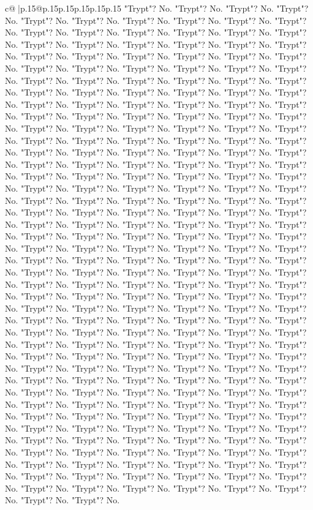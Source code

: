 \documentclass{article}
\begin{document}
{\begin{supertabular}{c@{$\;$}|p{.15\linewidth}@{}p{.15\linewidth}p{.15\linewidth}p{.15\linewidth}p{.15\linewidth}p{.15\linewidth}}
{{{"Trypt"? No. "Trypt"? No. "Trypt"? No. "Trypt"? No. "Trypt"? No. "Trypt"? No. "Trypt"? No. "Trypt"? No. "Trypt"? No. "Trypt"? No. "Trypt"? No. "Trypt"? No. "Trypt"? No. "Trypt"? No. "Trypt"? No. "Trypt"? No. "Trypt"? No. "Trypt"? No. "Trypt"? No. "Trypt"? No. "Trypt"? No. "Trypt"? No. "Trypt"? No. "Trypt"? No. "Trypt"? No. "Trypt"? No. "Trypt"? No. "Trypt"? No. "Trypt"? No. "Trypt"? No. "Trypt"? No. "Trypt"? No. "Trypt"? No. "Trypt"? No. "Trypt"? No. "Trypt"? No. "Trypt"? No. "Trypt"? No. "Trypt"? No. "Trypt"? No. "Trypt"? No. "Trypt"? No. "Trypt"? No. "Trypt"? No. "Trypt"? No. "Trypt"? No. "Trypt"? No. "Trypt"? No. "Trypt"? No. "Trypt"? No. "Trypt"? No. "Trypt"? No. "Trypt"? No. "Trypt"? No. "Trypt"? No. "Trypt"? No. "Trypt"? No. "Trypt"? No. "Trypt"? No. "Trypt"? No. "Trypt"? No. "Trypt"? No. "Trypt"? No. "Trypt"? No. "Trypt"? No. "Trypt"? No. "Trypt"? No. "Trypt"? No. "Trypt"? No. "Trypt"? No. "Trypt"? No. "Trypt"? No. "Trypt"? No. "Trypt"? No. "Trypt"? No. "Trypt"? No. "Trypt"? No. "Trypt"? No. "Trypt"? No. "Trypt"? No. "Trypt"? No. "Trypt"? No. "Trypt"? No. "Trypt"? No. "Trypt"? No. "Trypt"? No. "Trypt"? No. "Trypt"? No. "Trypt"? No. "Trypt"? No. "Trypt"? No. "Trypt"? No. "Trypt"? No. "Trypt"? No. "Trypt"? No. "Trypt"? No. "Trypt"? No. "Trypt"? No. "Trypt"? No. "Trypt"? No. "Trypt"? No. "Trypt"? No. "Trypt"? No. "Trypt"? No. "Trypt"? No. "Trypt"? No. "Trypt"? No. "Trypt"? No. "Trypt"? No. "Trypt"? No. "Trypt"? No. "Trypt"? No. "Trypt"? No. "Trypt"? No. "Trypt"? No. "Trypt"? No. "Trypt"? No. "Trypt"? No. "Trypt"? No. "Trypt"? No. "Trypt"? No. "Trypt"? No. "Trypt"? No. "Trypt"? No. "Trypt"? No. "Trypt"? No. "Trypt"? No. "Trypt"? No. "Trypt"? No. "Trypt"? No. "Trypt"? No. "Trypt"? No. "Trypt"? No. "Trypt"? No. "Trypt"? No. "Trypt"? No. "Trypt"? No. "Trypt"? No. "Trypt"? No. "Trypt"? No. "Trypt"? No. "Trypt"? No. "Trypt"? No. "Trypt"? No. "Trypt"? No. "Trypt"? No. "Trypt"? No. "Trypt"? No. "Trypt"? No. "Trypt"? No. "Trypt"? No. "Trypt"? No. "Trypt"? No. "Trypt"? No. "Trypt"? No. "Trypt"? No. "Trypt"? No. "Trypt"? No. "Trypt"? No. "Trypt"? No. "Trypt"? No. "Trypt"? No. "Trypt"? No. "Trypt"? No. "Trypt"? No. "Trypt"? No. "Trypt"? No. "Trypt"? No. "Trypt"? No. "Trypt"? No. "Trypt"? No. "Trypt"? No. "Trypt"? No. "Trypt"? No. "Trypt"? No. "Trypt"? No. "Trypt"? No. "Trypt"? No. "Trypt"? No. "Trypt"? No. "Trypt"? No. "Trypt"? No. "Trypt"? No. "Trypt"? No. "Trypt"? No. "Trypt"? No. "Trypt"? No. "Trypt"? No. "Trypt"? No. "Trypt"? No. "Trypt"? No. "Trypt"? No. "Trypt"? No. "Trypt"? No. "Trypt"? No. "Trypt"? No. "Trypt"? No. "Trypt"? No. "Trypt"? No. "Trypt"? No. "Trypt"? No. "Trypt"? No. "Trypt"? No. "Trypt"? No. "Trypt"? No. "Trypt"? No. "Trypt"? No. "Trypt"? No. "Trypt"? No. "Trypt"? No. "Trypt"? No. "Trypt"? No. "Trypt"? No. "Trypt"? No. "Trypt"? No. "Trypt"? No. "Trypt"? No. "Trypt"? No. "Trypt"? No. "Trypt"? No. "Trypt"? No. "Trypt"? No. "Trypt"? No. "Trypt"? No. "Trypt"? No. "Trypt"? No. "Trypt"? No. "Trypt"? No. "Trypt"? No. "Trypt"? No. "Trypt"? No. "Trypt"? No. "Trypt"? No. "Trypt"? No. "Trypt"? No. "Trypt"? No. "Trypt"? No. "Trypt"? No. "Trypt"? No. "Trypt"? No. "Trypt"? No. "Trypt"? No. "Trypt"? No. "Trypt"? No. "Trypt"? No. "Trypt"? No. }}}
\end{supertabular}}
\end{document}
